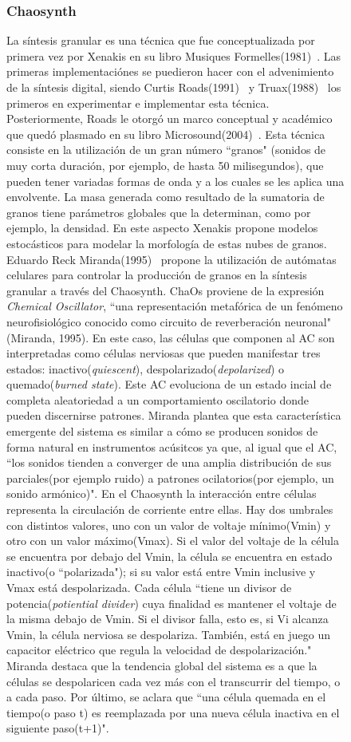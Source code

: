 \documentclass[16pt,spanish]{article}
\begin{document}
\begin{figure}[h!]
\subsubsection{Chaosynth}
	La síntesis granular es una técnica que fue conceptualizada por primera vez por Xenakis en su libro Musiques Formelles(1981)~\cite{xenakis1981musiques}. Las primeras implementaciónes se puedieron hacer con el advenimiento de la síntesis digital, siendo Curtis Roads(1991)~\cite{roads1991asynchronous} y Truax(1988)~\cite{truax1988real} los primeros en experimentar e implementar esta técnica. Posteriormente, Roads le otorgó un marco conceptual y académico que quedó plasmado en su libro Microsound(2004)~\cite{roads2004microsound}. Esta técnica consiste en la utilización de un gran número ``granos" (sonidos de muy corta duración, por ejemplo, de hasta 50 milisegundos), que pueden tener variadas formas de onda y a los cuales se les aplica una envolvente. La masa generada como resultado de la sumatoria de granos tiene parámetros globales que la determinan, como por ejemplo, la densidad. En este aspecto Xenakis propone modelos estocásticos para modelar la morfología de estas nubes de granos. Eduardo Reck Miranda(1995)~\cite{miranda1995granular} propone la utilización de autómatas celulares para controlar la producción de granos en la síntesis granular a través del Chaosynth.
	ChaOs proviene de la expresión \textit{Chemical Oscillator}, ``una representación metafórica de un fenómeno neurofisiológico conocido como circuito de reverberación neuronal"(Miranda, 1995). En este caso, las células que componen al AC son interpretadas como células nerviosas que pueden manifestar tres estados: inactivo(\textit{quiescent}), despolarizado(\textit{depolarized}) o quemado(\textit{burned state}). Este AC evoluciona de un estado incial de completa aleatoriedad a un comportamiento oscilatorio donde pueden discernirse patrones. Miranda plantea que esta característica emergente del sistema es similar a cómo se producen sonidos de forma natural en instrumentos acúsitcos ya que, al igual que el AC, ``los sonidos tienden a converger de una amplia distribución de sus parciales(por ejemplo ruido) a patrones ocilatorios(por ejemplo, un sonido armónico)". En el Chaosynth la interacción entre células representa la circulación de corriente entre ellas. Hay dos umbrales con distintos valores, uno con un valor de voltaje mínimo(Vmin) y otro con un valor máximo(Vmax). Si el valor del voltaje de la célula se encuentra por debajo del Vmin, la célula se encuentra en estado inactivo(o ``polarizada"); si su valor está entre Vmin inclusive y Vmax está despolarizada. Cada célula ``tiene un divisor de potencia(\textit{potiential divider}) cuya finalidad es mantener el voltaje de la misma debajo de Vmin. Si el divisor falla, esto es, si Vi alcanza Vmin, la célula nerviosa se despolariza. También, está en juego un capacitor eléctrico que regula la velocidad de despolarización." Miranda destaca que la tendencia global del sistema es a que la células se despolaricen cada vez más con el transcurrir del tiempo, o a cada paso. Por último, se aclara que ``una célula quemada en el tiempo(o paso t) es reemplazada por una nueva célula inactiva en el siguiente paso(t+1)".


\end{figure}
\end{document}
